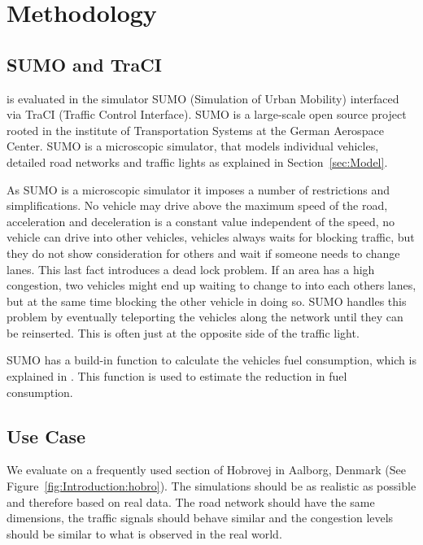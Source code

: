 \section{Methodology}\label{sec:methodology}

\subsection{SUMO and TraCI}\label{sec:methodology:sumo}
\tech is evaluated in the simulator SUMO (Simulation of Urban Mobility)\cite{sumo} interfaced via TraCI (Traffic Control Interface)\cite{traci}.
SUMO is a large-scale open source project rooted in the institute of Transportation Systems at the German Aerospace Center.
SUMO is a microscopic simulator, that models individual vehicles, detailed road networks and traffic lights as explained in Section~\ref{sec:Model}.

As SUMO is a microscopic simulator it imposes a number of restrictions and simplifications.
No vehicle may drive above the maximum speed of the road, acceleration and deceleration is a constant value independent of the speed, no vehicle can drive into other vehicles, vehicles always waits for blocking traffic, but they do not show consideration for others and wait if someone needs to change lanes.
This last fact introduces a dead lock problem.
If an area has a high congestion, two vehicles might end up waiting to change to into each others lanes, but at the same time blocking the other vehicle in doing so. 
SUMO handles this problem by eventually teleporting the vehicles along the network until they can be reinserted. 
This is often just at the opposite side of the traffic light.

SUMO has a build-in function to calculate the vehicles fuel consumption, which is explained in \cite{SUMOFuel}.
This function is used to estimate the reduction in fuel consumption.

\subsection{Use Case}\label{sec:UseCase}
We evaluate \tech on a frequently used section of Hobrovej in Aalborg, Denmark (See Figure~\ref{fig:Introduction:hobro}).
The simulations should be as realistic as possible and therefore based on real data. 
The road network should have the same dimensions, the traffic signals should behave similar and the congestion levels should be similar to what is observed in the real world.

